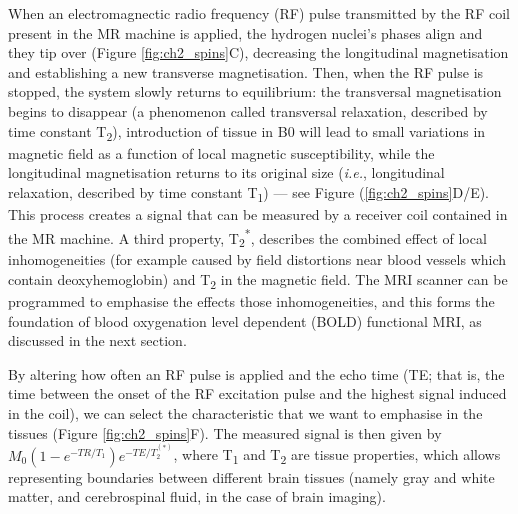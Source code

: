 When an electromagnectic radio frequency (RF) pulse transmitted by the RF coil present in the MR machine is applied, the hydrogen nuclei's phases align and they tip over (Figure \ref{fig:ch2_spins}C), decreasing the longitudinal magnetisation and establishing a new transverse magnetisation. 
Then, when the RF pulse is stopped, the system slowly returns to equilibrium: the transversal magnetisation begins to disappear (a phenomenon called transversal relaxation, described by time constant T\textsubscript{2}), introduction of tissue in B0 will lead to small variations in magnetic field as a function of local magnetic susceptibility, while the longitudinal magnetisation returns to its original size (\textit{i.e.}, longitudinal relaxation, described by time constant T\textsubscript{1}) --- see Figure (\ref{fig:ch2_spins}D/E). 
This process creates a signal that can be measured by a receiver coil contained in the MR machine. 
A third property,  T\textsubscript{2}\textsuperscript{*}, describes the combined effect of local inhomogeneities (for example caused by field distortions near blood vessels which contain deoxyhemoglobin) and T\textsubscript{2} in the magnetic field. 
The MRI scanner can be programmed to emphasise the effects those inhomogeneities, and this forms the foundation of blood oxygenation level dependent (BOLD) functional MRI, as discussed in the next section.

By altering how often an RF pulse is applied and the echo time (TE;  that is, the time between the onset of the RF excitation pulse and the highest signal induced in the coil), we can select the characteristic that we want to emphasise in the tissues (Figure \ref{fig:ch2_spins}F). 
The measured signal is then given by $M_0 (1-e ^{-TR/T_1} )e^{-TE/T_2^{(*)}}$,
where T\textsubscript{1} and T\textsubscript{2} are tissue properties, which allows representing boundaries between different brain tissues (namely gray and white matter, and cerebrospinal fluid, in the case of brain imaging).

